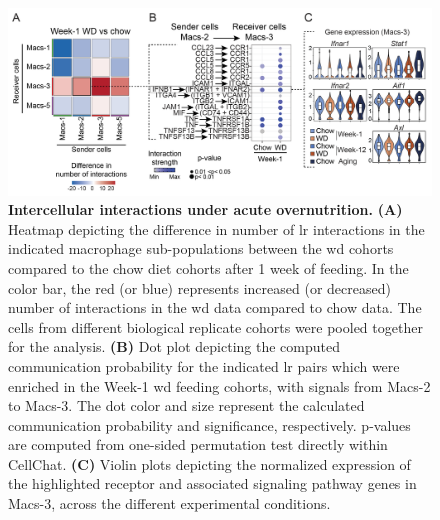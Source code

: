 \begin{figure}[b!]
\centering
\includegraphics[width=\linewidth]{Chapter4/Fig/F2-6-01.png}
\caption[Intercellular interactions under acute overnutrition]{\textbf{Intercellular interactions under acute overnutrition.} \textbf{(A)} Heatmap depicting the difference in number of \gls{lr} interactions in the indicated macrophage sub-populations between the \gls{wd} cohorts compared to the chow diet cohorts after 1 week of feeding. In the color bar, the red (or blue) represents increased (or decreased) number of interactions in the \gls{wd} data compared to chow data. The cells from different biological replicate cohorts were pooled together for the analysis. \textbf{(B)}  Dot plot depicting the computed communication probability for the indicated \gls{lr} pairs which were enriched in the Week-1 \gls{wd} feeding cohorts, with signals from Macs-2 to Macs-3. The dot color and size represent the calculated communication probability and significance, respectively. p-values are computed from one-sided permutation test directly within CellChat. \textbf{(C)} Violin plots depicting the normalized expression of the highlighted receptor and associated signaling pathway genes in Macs-3, across the different experimental conditions.}
\label{fig:chp2_scrna_cellchat1}
\end{figure}

